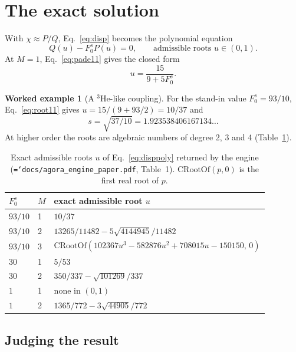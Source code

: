 \documentclass[11pt,a4paper,openany]{book}
\newcommand{\Fzs}{F_0^{s}}
\newcommand{\code}[1]{\texttt{\hyphenchar\font=`\-\relax #1}}
\theoremstyle{definition}
\newtheorem{example}{Worked example}[chapter]
\theoremstyle{plain}
\begin{document}
\section{The exact solution}

With $\chi\approx P/Q$, Eq.~\eqref{eq:disp} becomes the polynomial equation
\begin{equation}
  Q(u)-\Fzs P(u)=0,\qquad\text{admissible roots } u\in(0,1).
  \label{eq:disppoly}
\end{equation}
At $M=1$, Eq.~\eqref{eq:pade11} gives the closed form
\begin{equation}
  u=\frac{15}{9+5\Fzs}.
  \label{eq:root11}
\end{equation}

\begin{example}[A $^3$He-like coupling]
For the stand-in value $\Fzs=93/10$, Eq.~\eqref{eq:root11} gives $u=15/(9+93/2)=10/37$ and
\[
  s=\sqrt{37/10}=1.923538406167134\ldots
\]
At higher order the roots are algebraic numbers of degree 2, 3 and 4 (Table~\ref{tab:exact}).
\end{example}

\begin{table}[htbp]
\centering
\caption{Exact admissible roots $u$ of Eq.~\eqref{eq:disppoly} returned by the engine
(\code{docs/agora\_engine\_paper.pdf}, Table~1). $\mathrm{CRootOf}(p,0)$ is the first real root
of $p$.}
\label{tab:exact}
\small
\begin{tabular}{ll>{\raggedright\arraybackslash}p{9.6cm}}
\toprule
$\Fzs$ & $M$ & exact admissible root $u$ \\
\midrule
$93/10$ & 1 & $10/37$ \\
$93/10$ & 2 & $13265/11482 - 5\sqrt{4144945}/11482$ \\
$93/10$ & 3 & $\mathrm{CRootOf}(102367u^{3} - 582876u^{2} + 708015u - 150150,\,0)$ \\
$30$ & 1 & $5/53$ \\
$30$ & 2 & $350/337 - \sqrt{101269}/337$ \\
$1$ & 1 & none in $(0,1)$ \\
$1$ & 2 & $1365/772 - 3\sqrt{44905}/772$ \\
\bottomrule
\end{tabular}
\end{table}

\subsection{Judging the result}
\end{document}
